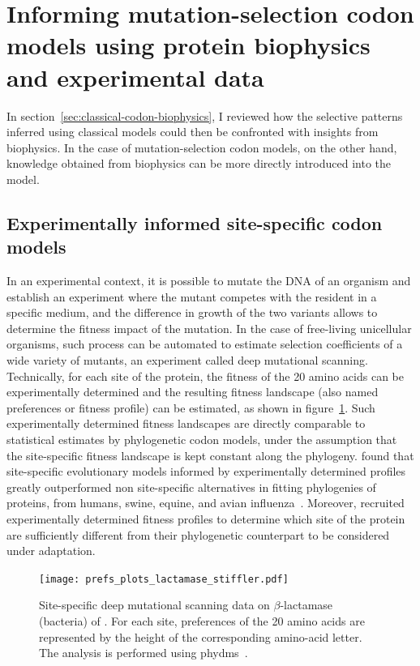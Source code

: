 \section{Informing mutation-selection codon models using protein biophysics and experimental data}
\label{sec:mechanistic-codon-biophysics}

In section~\ref{sec:classical-codon-biophysics}, I reviewed how the selective patterns inferred using classical models could then be confronted with insights from biophysics.
In the case of mutation-selection \gls{codon} models, on the other hand, knowledge obtained from biophysics can be more directly introduced into the model.

\subsection{Experimentally informed site-specific codon models}

In an experimental context, it is possible to mutate the \acrshort{DNA} of an organism and establish an experiment where the mutant competes with the resident in a specific medium, and the difference in growth of the two variants allows to determine the fitness impact of the mutation.
In the case of free-living unicellular organisms, such process can be automated to estimate selection coefficients of a wide variety of mutants, an experiment called deep mutational scanning.
Technically, for each site of the protein, the fitness of the 20 amino acids can be experimentally determined and the resulting fitness landscape (also named preferences or fitness profile) can be estimated, as shown in figure~\ref{fig:intro-deep-mut-profile}.
Such experimentally determined fitness landscapes are directly comparable to statistical estimates by phylogenetic \gls{codon} models, under the assumption that the site-specific fitness landscape is kept constant along the phylogeny.
\citet{Bloom2014,Bloom2014a} found that site-specific evolutionary models informed by experimentally determined profiles greatly outperformed non site-specific alternatives in fitting phylogenies of proteins, from humans, swine, equine, and avian influenza~\citep{Doud2015}.
Moreover, \citet{Bloom2017} recruited experimentally determined fitness profiles to determine which site of the protein are sufficiently different from their phylogenetic counterpart to be considered under adaptation.

\begin{figure}[htbp]
    \centering
    \texttt{[image: prefs\_plots\_lactamase\_stiffler.pdf]}
    \caption[Deep mutational scanning profile]{
    Site-specific deep mutational scanning data on $\beta$-lactamase (bacteria) of \citet{Stiffler2015}.
    For each site, preferences of the 20 amino acids are represented by the height of the corresponding amino-acid letter.
    The analysis is performed using phydms~\citep{Hilton2017}.}
    \label{fig:intro-deep-mut-profile}
\end{figure}

